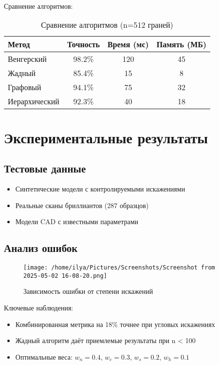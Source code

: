 \documentclass[a4paper,12pt]{article}
\begin{document}
Сравнение алгоритмов:
\begin{table}[H]
\centering
\begin{tabular}{@{}lccc@{}}
\toprule
Метод & Точность & Время (мс) & Память (МБ) \\ \midrule
Венгерский & 98.2\% & 120 & 45 \\
Жадный & 85.4\% & 15 & 8 \\
Графовый & 94.1\% & 75 & 32 \\
Иерархический & 92.3\% & 40 & 18 \\ \bottomrule
\end{tabular}
\caption{Сравнение алгоритмов (n=512 граней)}
\end{table}

\section{Экспериментальные результаты}
\subsection{Тестовые данные}
\begin{itemize}
    \item Синтетические модели с контролируемыми искажениями
    \item Реальные сканы бриллиантов (287 образцов)
    \item Модели CAD с известными параметрами
\end{itemize}

\subsection{Анализ ошибок}
\begin{figure}[H]
\centering
\texttt{[image: /home/ilya/Pictures/Screenshots/Screenshot from 2025-05-02 16-08-20.png]}
\caption{Зависимость ошибки от степени искажений}
\label{fig:errors}
\end{figure}

Ключевые наблюдения:
\begin{itemize}
    \item Комбинированная метрика на 18\% точнее при угловых искажениях
    \item Жадный алгоритм даёт приемлемые результаты при n < 100
    \item Оптимальные веса: $w_n=0.4$, $w_c=0.3$, $w_s=0.2$, $w_h=0.1$
\end{itemize}
\end{document}
